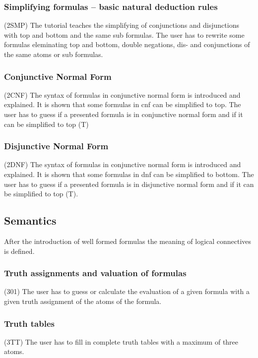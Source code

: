 \subsubsection{Simplifying formulas – basic natural deduction rules}
\label{tut:2SMP}

(2SMP) The tutorial teaches the simplifying of conjunctions and disjunctions with top and bottom and the same sub formulas.
The user has to rewrite some formulas eleminating top and bottom, double negations, dis- and conjunctions of the same atoms or sub formulas.

\subsubsection{Conjunctive Normal Form} 
\label{tut:2CNF}
(2CNF) The syntax of formulas in conjunctive normal form is introduced and explained.
It is shown that some formulas in cnf can be simplified to top.
The user has to guess if a presented formula is in conjunctive normal form
and if it can be simplified to top (T)

\subsubsection{Disjunctive Normal Form} 
\label{tut:2DNF}
(2DNF) The syntax of formulas in conjunctive normal form is introduced and explained.
It is shown that some formulas in dnf can be simplified to bottom.
The user has to guess if a presented formula is in disjunctive normal form
and if it can be simplified to top (T).

\subsection{Semantics}

After the introduction of well formed formulas the meaning of logical connectives is defined.

\subsubsection{Truth assignments and valuation of formulas}
\label{tut:301}
(301)
The user has to guess or calculate the evaluation of a given formula with a given truth assignment of the atoms of the formula.

\subsubsection{Truth tables}
\label{tut:3TT}
(3TT)
The user has to fill in complete truth tables with a maximum of three atoms.

